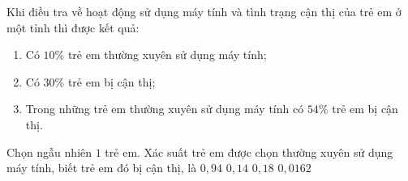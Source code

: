 \begin{ex}%
	Khi  điều tra về hoạt động sử dụng máy tính và tình trạng cận thị của trẻ em ở một tỉnh thì được kết quả:
	\begin{enumerate}[-]
		 \item Có $10\%$ trẻ em thường xuyên sử dụng máy tính;
		\item Có $30\%$  trẻ em bị cận thị;
		\item Trong  những trẻ em thường xuyên sử dụng máy tính có $54\% $ trẻ em bị cận thị.
	\end{enumerate}
	Chọn ngẫu nhiên $1$ trẻ em. Xác suất trẻ em được chọn thường  xuyên sử dụng máy tính, biết trẻ em đó bị cận thị, là
	 \choice
		 {$0{,}94$}
		 {$0{,}14$}
		 {\True$0{,}18$}
		 {$0{,}0162$}
\end{ex}

